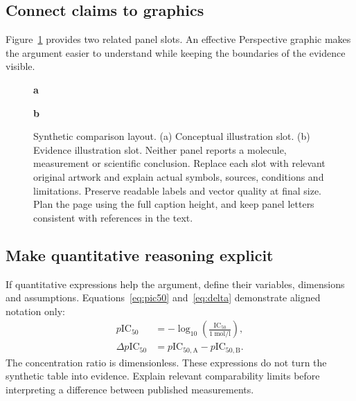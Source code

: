 \documentclass[letterpaper,12pt]{article}
\begin{document}
\subsection{Connect claims to graphics}
Figure~\ref{fig:comparison} provides two related panel slots. An effective
Perspective graphic makes the argument easier to understand while keeping
the boundaries of the evidence visible.
\begin{figure}[htbp]
\centering
\begin{minipage}[t]{0.47\linewidth}
\centering\textbf{a}\par\smallskip
{}
\end{minipage}\hfill
\begin{minipage}[t]{0.47\linewidth}
\centering\textbf{b}\par\smallskip
{}
\end{minipage}
\caption{Synthetic comparison layout. (a) Conceptual illustration slot.
(b) Evidence illustration slot. Neither panel reports a molecule,
measurement or scientific conclusion. Replace each slot with relevant
original artwork and explain actual symbols, sources, conditions and
limitations. Preserve readable labels and vector quality at final size.
Plan the page using the full caption height, and keep panel letters
consistent with references in the text.}
\label{fig:comparison}
\end{figure}

\subsection{Make quantitative reasoning explicit}
If quantitative expressions help the argument, define their variables,
dimensions and assumptions. Equations~\eqref{eq:pic50} and~\eqref{eq:delta}
demonstrate aligned notation only:
\begin{align}
 p\mathrm{IC}_{50} &= -\log_{10}\!\left(
 \frac{\mathrm{IC}_{50}}{\qty{1}{\mole\per\litre}}\right),\label{eq:pic50}\\
 \Delta p\mathrm{IC}_{50} &= p\mathrm{IC}_{50,\mathrm{A}}
                         -p\mathrm{IC}_{50,\mathrm{B}}.\label{eq:delta}
\end{align}
The concentration ratio is dimensionless. These expressions do not turn
the synthetic table into evidence. Explain relevant comparability limits
before interpreting a difference between published measurements.
\end{document}
